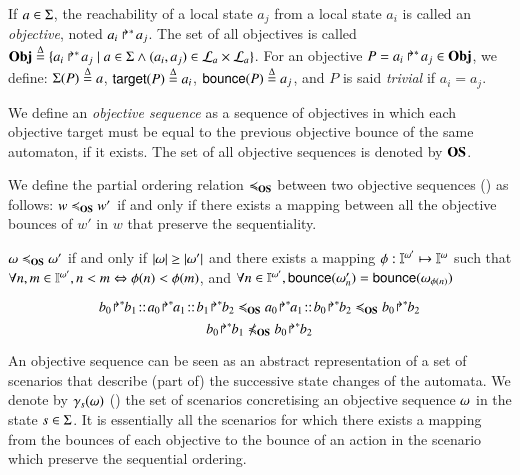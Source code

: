 \begin{definition}
\label{def:obj}
  If $a \in \Sigma$, the reachability of a local state $a_j$ from a local state $a_i$ is called an \emph{objective}, noted $\mbox{$a_i\Rsh^*\!a_j$}$.
  The set of all objectives is called $\mathbf{Obj} \stackrel{\Delta}= \{ \mbox{$a_i\Rsh^*\!a_j$} \mid a \in \Sigma \wedge (a_i, a_j) \in \mathcal{L}_a \times \mathcal{L}_a \}$.
  For an objective $P = \mbox{$a_i\Rsh^*\!a_j$} \in \mathbf{Obj}$, we define: $\Sigma(P) \stackrel{\Delta}=
  a$, $\mathsf{target}(P)\stackrel{\Delta}= a_i$, $\mathsf{bounce}(P)\stackrel{\Delta}= a_j$,
  and $P$ is said \emph{trivial} if $a_i = a_j$.

  We define an \emph{objective sequence} as a sequence of objectives in which each objective target must be equal to the previous objective bounce of the same automaton, if it exists.
  The set of all objective sequences is denoted by $\mathbf{OS}$.
\end{definition}

We define the partial ordering relation $\preccurlyeq_{\mathbf{OS}}$ between two objective sequences () as
follows:
$w\preccurlyeq_{\mathbf{OS}} w'$ if and only if there exists a mapping between all the objective bounces of $w'$ in $w$
that preserve the sequentiality.


\begin{definition}[$\ltw \subset \OS\times\OS$]\label{def:ltw}
$\omega\preccurlyeq_{\mathbf{OS}}\omega'$ if and only if
$|\omega|\geq|\omega'|$ and
there exists a mapping $\phi: \mathbb{I}^{\omega'}\mapsto \mathbb{I}^{\omega}$ such that
$\forall n,m \in\mathbb{I}^{\omega'}, n<m \Leftrightarrow \phi(n)<\phi(m)$,
and
$\forall n\in\mathbb{I}^{\omega'}, \mathsf{bounce}(\omega'_n)=\mathsf{bounce}(\omega_{\phi(n)})$
\end{definition}

\begin{example}
\[\obj{b_0}{b_1}\concat\obj{a_0}{a_1}\concat\obj{b_1}{b_2}
\ltw
\obj{a_0}{a_1}\concat\obj{b_0}{b_2}
\ltw
\obj{b_0}{b_2}\]
\[\obj{b_0}{b_1}\not\ltw\obj{b_0}{b_2}\]
\end{example}

An objective sequence can be seen as an abstract representation of a set of scenarios that describe
(part of) the successive state changes of the automata.
We denote by $\gamma_s(\omega)$ () the set of scenarios concretising an objective sequence
$\omega$ in the state $s\in\Sigma$.
It is essentially all the scenarios for which there exists a mapping from the bounces of each
objective to the bounce of an action in the scenario which preserve the sequential ordering.


